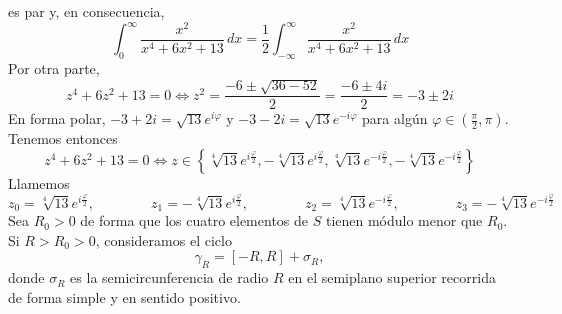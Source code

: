 \documentclass[11pt]{report}
\makeatletter
\renewenvironment{proof}[1][\proofname]{\par
  \pushQED{\qed}%
  \normalfont \topsep\z@skip %
  \trivlist
  \item[\hskip\labelsep
        \itshape
    #1\@addpunct{.}]\ignorespaces
}{%
  \popQED\endtrivlist\@endpefalse
}
\makeatother
\begin{document}
\begin{proof}
\begin{enumerate}
  es par y, en consecuencia,
  \[\int_0^\infty \frac{x^2}{x^4+6x^2+13} \, dx = \frac{1}{2}\int_{-\infty}^\infty \frac{x^2}{x^4+6x^2+13} \, dx\]
  Por otra parte,
  \[z^4+6z^2+13 = 0 \iff z^2 = \frac{-6\pm \sqrt{36-52}}{2} = \frac{-6\pm 4i}{2} = -3\pm 2i\]
  En forma polar, $-3+2i = \sqrt{13}e^{i\varphi}$ y $-3-2i=\sqrt{13}e^{-i\varphi}$ para algún $\varphi \in (\frac{\pi}{2},\pi)$. Tenemos entonces
  \[z^4+6z^2+13=0 \iff z \in \left\{\sqrt[4]{13}e^{i\frac{\varphi}{2}}, -\sqrt[4]{13}e^{i\frac{\varphi}{2}}, \sqrt[4]{13}e^{-i\frac{\varphi}{2}}, -\sqrt[4]{13}e^{-i\frac{\varphi}{2}}\right\}\]
  Llamemos
  \[z_0 = \sqrt[4]{13}e^{i\frac{\varphi}{2}}, \qquad \qquad z_1 = -\sqrt[4]{13}e^{i\frac{\varphi}{2}}, \qquad \qquad z_2 = \sqrt[4]{13}e^{-i\frac{\varphi}{2}}, \qquad \qquad z_3 = -\sqrt[4]{13}e^{-i\frac{\varphi}{2}}\]
  Sea $R_0>0$ de forma que los cuatro elementos de $S$ tienen módulo menor que $R_0$. Si $R >R_0>0$, consideramos el ciclo
  \[\gamma_R = [-R,R]+\sigma_R,\]
  donde $\sigma_R$ es la semicircunferencia de radio $R$ en el semiplano superior recorrida de forma simple y en sentido positivo. 
  

\end{enumerate}
\end{proof}
\end{document}
